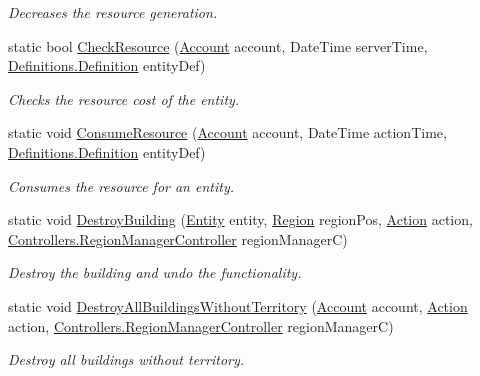 \begin{DoxyCompactItemize}
\begin{DoxyCompactList}\small\item\em Decreases the resource generation. \end{DoxyCompactList}\item 
static bool \hyperlink{classCore_1_1Models_1_1LogicRules_ae686cefdb61e6caee8bc0dee09ee71f3}{Check\+Resource} (\hyperlink{classCore_1_1Models_1_1Account}{Account} account, Date\+Time server\+Time, \hyperlink{classCore_1_1Models_1_1Definitions_1_1Definition}{Definitions.\+Definition} entity\+Def)
\begin{DoxyCompactList}\small\item\em Checks the resource cost of the entity. \end{DoxyCompactList}\item 
static void \hyperlink{classCore_1_1Models_1_1LogicRules_ad3b250727f8358799fc881cb0c00644d}{Consume\+Resource} (\hyperlink{classCore_1_1Models_1_1Account}{Account} account, Date\+Time action\+Time, \hyperlink{classCore_1_1Models_1_1Definitions_1_1Definition}{Definitions.\+Definition} entity\+Def)
\begin{DoxyCompactList}\small\item\em Consumes the resource for an entity. \end{DoxyCompactList}\item 
static void \hyperlink{classCore_1_1Models_1_1LogicRules_aa71e5341064abab193e8cb472d4e906f}{Destroy\+Building} (\hyperlink{classCore_1_1Models_1_1Entity}{Entity} entity, \hyperlink{classCore_1_1Models_1_1Region}{Region} region\+Pos, \hyperlink{classCore_1_1Models_1_1Action}{Action} action, \hyperlink{classCore_1_1Controllers_1_1RegionManagerController}{Controllers.\+Region\+Manager\+Controller} region\+Manager\+C)
\begin{DoxyCompactList}\small\item\em Destroy the building and undo the functionality. \end{DoxyCompactList}\item 
static void \hyperlink{classCore_1_1Models_1_1LogicRules_a7139405da4b52991042628844749b791}{Destroy\+All\+Buildings\+Without\+Territory} (\hyperlink{classCore_1_1Models_1_1Account}{Account} account, \hyperlink{classCore_1_1Models_1_1Action}{Action} action, \hyperlink{classCore_1_1Controllers_1_1RegionManagerController}{Controllers.\+Region\+Manager\+Controller} region\+Manager\+C)
\begin{DoxyCompactList}\small\item\em Destroy all buildings without territory. \end{DoxyCompactList}\end{DoxyCompactItemize}
